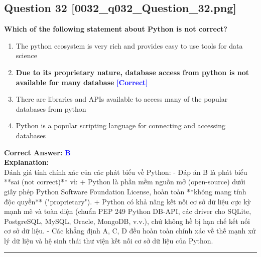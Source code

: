 \documentclass[11pt,a4paper]{article}
\begin{document}
\begin{minipage}{\textwidth}
\subsection*{Question 32 \quad \footnotesize{[0032_q032_Question_32.png]}}
\noindent \textbf{Which of the following statement about Python is not correct?}

\begin{enumerate}[label=\Alph*.]
    \item The python ecosystem is very rich and provides easy to use tools for data science
    \item \textbf{Due to its proprietary nature, database access from python is not available for many database} \hfill \textcolor{blue}{\textbf{[Correct]}}
    \item There are libraries and APIs available to access many of the popular databases from python
    \item Python is a popular scripting language for connecting and accessing databases
\end{enumerate}

\noindent \textbf{Correct Answer:} \textcolor{blue}{\textbf{B}} \\[4pt]
\noindent \textbf{Explanation:}\\
Đánh giá tính chính xác của các phát biểu về Python:\newline
- Đáp án B là phát biểu **sai (not correct)** vì:\newline
  + Python là phần mềm nguồn mở (open-source) dưới giấy phép Python Software Foundation License, hoàn toàn **không mang tính độc quyền** ("proprietary").\newline
  + Python có khả năng kết nối cơ sở dữ liệu cực kỳ mạnh mẽ và toàn diện (chuẩn PEP 249 Python DB-API, các driver cho SQLite, PostgreSQL, MySQL, Oracle, MongoDB, v.v.), chứ không hề bị hạn chế kết nối cơ sở dữ liệu.\newline
- Các khẳng định A, C, D đều hoàn toàn chính xác về thế mạnh xử lý dữ liệu và hệ sinh thái thư viện kết nối cơ sở dữ liệu của Python.
\end{minipage}
\vspace{0.8cm}
\hrule
\vspace{0.5cm}
\end{document}
